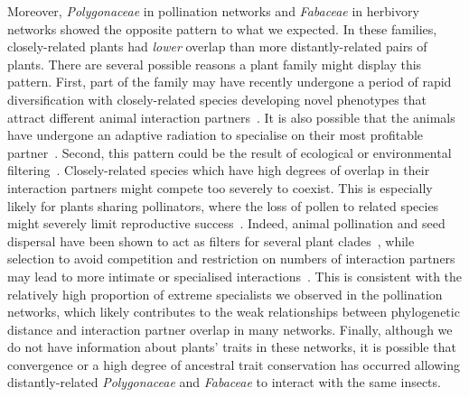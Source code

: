 \documentclass[12pt]{article}
\begin{document}
\begin{spacing}{1.5}
  Moreover, \emph{Polygonaceae} in pollination networks and 
  \emph{Fabaceae} in herbivory networks showed the opposite 
  pattern to what we expected. In these families, closely-related plants had 
  \emph{lower} overlap than more distantly-related pairs of plants. 
  There are several possible reasons a plant family might
  display this pattern. First, part of the family may have recently 
  undergone a period of rapid diversification with closely-related species 
  developing novel phenotypes that attract different animal 
  interaction partners~\citep{Linder2008,Breitkopf2015}. It is also possible that the
  animals have undergone an adaptive radiation to 
  specialise on their most profitable partner~\citep{Janz2006}. Second, this pattern 
  could be the result of ecological or environmental 
  filtering~\citep{Ackerly2003,Mayfield2009}. 
  Closely-related species which have high degrees of overlap in their interaction 
  partners might compete too severely to coexist. This is especially likely
  for plants sharing pollinators, where the loss of pollen to related species 
  might severely limit reproductive success~\citep{Levin1970,Bell2005,Mitchell2009}.
  Indeed, animal pollination and seed dispersal have been shown to act
  as filters for several plant clades~\citep{Mayfield2009}, while selection to avoid 
  competition and restriction on numbers of interaction partners may lead to
  more intimate or specialised interactions~\citep{Ponisio2017}. This is
  consistent with the relatively high proportion of extreme specialists we
  observed in the pollination networks, which likely contributes to the weak
  relationships between phylogenetic distance and interaction partner overlap
  in many networks. Finally, although we do not have information about plants'
  traits in these networks, it is possible that convergence or a high degree of
  ancestral trait conservation has occurred
  allowing distantly-related \emph{Polygonaceae} and \emph{Fabaceae} to
  interact with the same insects. 



\end{spacing}
\end{document}
